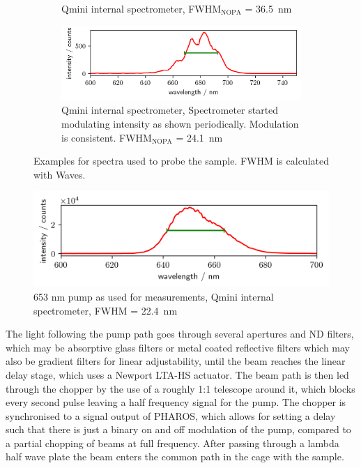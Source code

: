 \documentclass[twoside,openright]{scrreprt}
\begin{document}
\begin{figure}[hbtp]
\begin{subfigure}[b]{\textwidth}
\caption{Qmini internal spectrometer, FWHM$_{\mathrm{NOPA}}$ = \SI{36.5}{\nano\meter}}
\end{subfigure}
\begin{subfigure}[b]{\textwidth}
\centering
\includegraphics[scale=1]{images/spectra/2024-02-05/probe_3H_680nm.png}
\caption{Qmini internal spectrometer, Spectrometer started modulating intensity as shown periodically. Modulation is consistent. FWHM$_{\mathrm{NOPA}}$ = \SI{24.1}{\nano\meter}\label{fig:spectrometerMalfunction}}
\end{subfigure}
\caption{Examples for spectra used to probe the sample. FWHM is calculated with Waves.\label{fig:probeSpectra}}
\end{figure}

\begin{figure}[hbt]
\centering
\includegraphics[scale=1]{images/spectra/2024-02-05/pump_2H_653nm.png}
\caption{653 nm pump as used for measurements, Qmini internal spectrometer, FWHM = \SI{22.4}{\nano\meter}}
\end{figure}

The light following the pump path goes through several apertures and ND filters, which may be absorptive glass filters or metal coated reflective filters which may also be gradient filters for linear adjustability, until the beam reaches the linear delay stage, which uses a Newport LTA-HS actuator. The beam path is then led through the chopper by the use of a roughly 1:1 telescope around it, which blocks every second pulse leaving a half frequency signal for the pump. The chopper is synchronised to a signal output of PHAROS, which allows for setting a delay such that there is just a binary on and off modulation of the pump, compared to a partial chopping of beams at full frequency. After passing through a lambda half wave plate the beam enters the common path in the cage with the sample.
\end{document}
